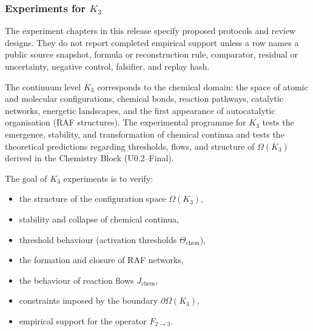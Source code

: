 
\subsubsection{Experiments for \texorpdfstring{$K_3$}{K_3}}

The experiment chapters in this release specify proposed protocols and review designs. They do not report completed empirical support unless a row names a public source snapshot, formula or reconstruction rule, comparator, residual or uncertainty, negative control, falsifier, and replay hash.
\label{sec:experiments-k3}

The continuum level $K_3$ corresponds to the chemical domain:
the space of atomic and molecular configurations, chemical bonds,
reaction pathways, catalytic networks, energetic landscapes,
and the first appearance of autocatalytic organisation (RAF structures).
The experimental programme for $K_3$ tests the emergence, stability,
and transformation of chemical continua and tests the theoretical
predictions regarding thresholds, flows, and structure of
$\Omega(K_3)$ derived in the Chemistry Block (U0.2–Final).

The goal of $K_3$ experiments is to verify:

\begin{itemize}
    \item the structure of the configuration space $\Omega(K_3)$,
    \item stability and collapse of chemical continua,
    \item threshold behaviour (activation thresholds $\Theta_{\mathrm{chem}}$),
    \item the formation and closure of RAF networks,
    \item the behaviour of reaction flows $J_{\mathrm{chem}}$,
    \item constraints imposed by the boundary $\partial \Omega(K_3)$,
    \item empirical support for the operator $F_{2\rightarrow 3}$.
\end{itemize}



